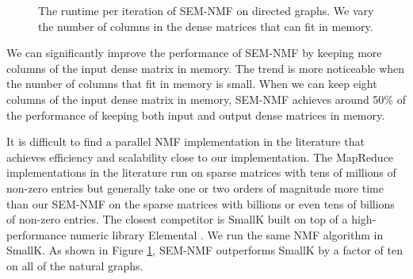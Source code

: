 \begin{figure}
	\begin{center}
		\footnotesize
		
		\caption{The runtime per iteration of SEM-NMF on directed graphs.
			We vary the number of columns in the dense matrices that can fit
		in memory.}
		\label{perf:NMF}
	\end{center}
\end{figure}

We can significantly improve the performance of SEM-NMF by keeping more columns
of the input dense matrix in memory. The trend is more noticeable when the number of
columns that fit in memory is small. When we can keep eight columns of the input
dense matrix in memory, SEM-NMF achieves around 50\% of the performance of keeping
both input and output dense matrices in memory.

It is difficult to find a parallel NMF implementation in the literature that
achieves efficiency and scalability close to our implementation. The MapReduce
implementations in the literature \cite{Liao14, Yin14, Liu10} run on sparse
matrices with tens of millions of non-zero entries but generally take
one or two orders of magnitude more time than our SEM-NMF on the sparse matrices
with billions or even tens of billions of non-zero entries. The closest competitor
is SmallK \cite{SmallK} built on top of a high-performance numeric library
Elemental \cite{elemental}. We run the same NMF algorithm in SmallK. As shown
in Figure \ref{perf:NMF}, SEM-NMF outperforms SmallK by a factor of ten on
all of the natural graphs.
